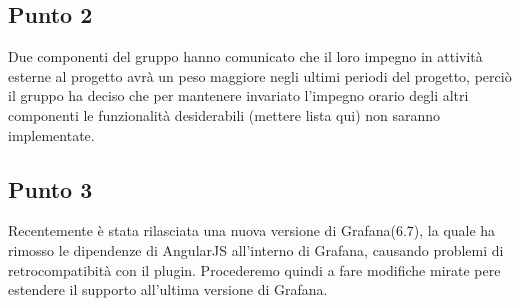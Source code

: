     \subsection{Punto 2}
    Due componenti del gruppo hanno comunicato che il loro impegno in attività esterne al progetto avrà un peso maggiore negli ultimi periodi del progetto, perciò il gruppo ha deciso che per mantenere invariato l'impegno orario degli altri componenti le funzionalità desiderabili (mettere lista qui) non saranno implementate.   
    \subsection{Punto 3}
    Recentemente è stata rilasciata una nuova versione di Grafana\glosp (6.7), la quale ha rimosso le dipendenze di AngularJS all'interno di Grafana\glo, causando problemi di retrocompatibità con il plugin. Procederemo quindi a fare modifiche mirate pere estendere il supporto all'ultima versione di Grafana\glo.
